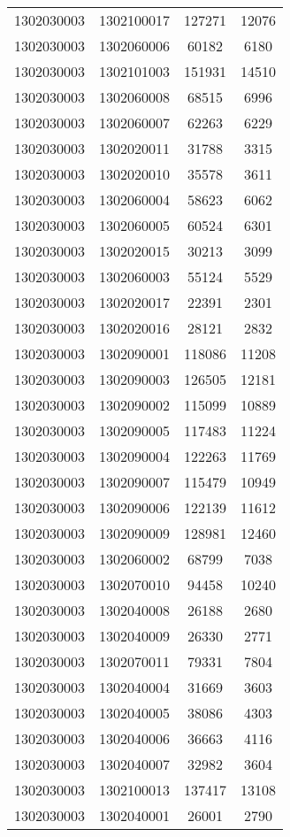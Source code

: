 \begin{longtable}[h]{llcc}
		1302030003 & 1302100017 & 127271 & 12076\\
		1302030003 & 1302060006 & 60182 & 6180\\
		1302030003 & 1302101003 & 151931 & 14510\\
		1302030003 & 1302060008 & 68515 & 6996\\
		1302030003 & 1302060007 & 62263 & 6229\\
		1302030003 & 1302020011 & 31788 & 3315\\
		1302030003 & 1302020010 & 35578 & 3611\\
		1302030003 & 1302060004 & 58623 & 6062\\
		1302030003 & 1302060005 & 60524 & 6301\\
		1302030003 & 1302020015 & 30213 & 3099\\
		1302030003 & 1302060003 & 55124 & 5529\\
		1302030003 & 1302020017 & 22391 & 2301\\
		1302030003 & 1302020016 & 28121 & 2832\\
		1302030003 & 1302090001 & 118086 & 11208\\
		1302030003 & 1302090003 & 126505 & 12181\\
		1302030003 & 1302090002 & 115099 & 10889\\
		1302030003 & 1302090005 & 117483 & 11224\\
		1302030003 & 1302090004 & 122263 & 11769\\
		1302030003 & 1302090007 & 115479 & 10949\\
		1302030003 & 1302090006 & 122139 & 11612\\
		1302030003 & 1302090009 & 128981 & 12460\\
		1302030003 & 1302060002 & 68799 & 7038\\
		1302030003 & 1302070010 & 94458 & 10240\\
		1302030003 & 1302040008 & 26188 & 2680\\
		1302030003 & 1302040009 & 26330 & 2771\\
		1302030003 & 1302070011 & 79331 & 7804\\
		1302030003 & 1302040004 & 31669 & 3603\\
		1302030003 & 1302040005 & 38086 & 4303\\
		1302030003 & 1302040006 & 36663 & 4116\\
		1302030003 & 1302040007 & 32982 & 3604\\
		1302030003 & 1302100013 & 137417 & 13108\\
		1302030003 & 1302040001 & 26001 & 2790\\

\end{longtable}
